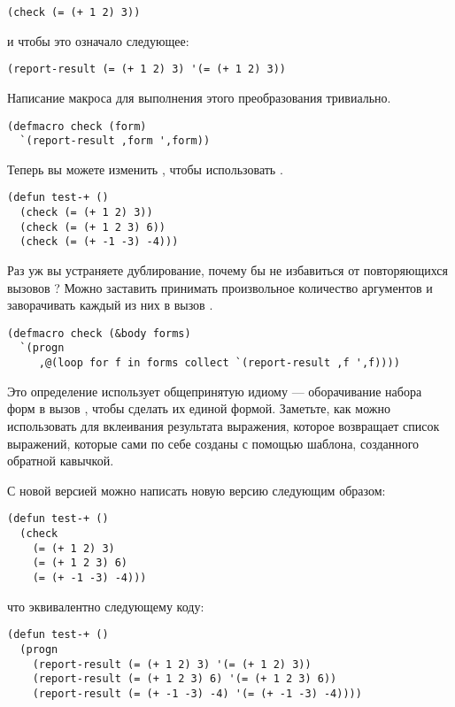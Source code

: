 \begin{lstlisting}
(check (= (+ 1 2) 3))
\end{lstlisting}

и чтобы это означало следующее:

\begin{lstlisting}
(report-result (= (+ 1 2) 3) '(= (+ 1 2) 3))
\end{lstlisting}

Написание макроса для выполнения этого преобразования тривиально.

\begin{lstlisting}
(defmacro check (form)
  `(report-result ,form ',form))
\end{lstlisting}

Теперь вы можете изменить , чтобы использовать .

\begin{lstlisting}
(defun test-+ ()
  (check (= (+ 1 2) 3))
  (check (= (+ 1 2 3) 6))
  (check (= (+ -1 -3) -4)))
\end{lstlisting}

Раз уж вы устраняете дублирование, почему бы не избавиться от повторяющихся вызовов
? Можно заставить  принимать произвольное количество аргументов и
заворачивать каждый из них в вызов .

\begin{lstlisting}
(defmacro check (&body forms)
  `(progn
     ,@(loop for f in forms collect `(report-result ,f ',f))))
\end{lstlisting}

Это определение использует общепринятую идиому --- оборачивание набора форм в вызов
, чтобы сделать их единой формой. Заметьте, как можно использовать 
для вклеивания результата выражения, которое возвращает список выражений, которые сами по
себе созданы с помощью шаблона, созданного обратной кавычкой.

С новой версией  можно написать новую версию  следующим образом:

\begin{lstlisting}
(defun test-+ ()
  (check
    (= (+ 1 2) 3)
    (= (+ 1 2 3) 6)
    (= (+ -1 -3) -4)))
\end{lstlisting}

что эквивалентно следующему коду:

\begin{lstlisting}
(defun test-+ ()
  (progn
    (report-result (= (+ 1 2) 3) '(= (+ 1 2) 3))
    (report-result (= (+ 1 2 3) 6) '(= (+ 1 2 3) 6))
    (report-result (= (+ -1 -3) -4) '(= (+ -1 -3) -4))))
\end{lstlisting}

